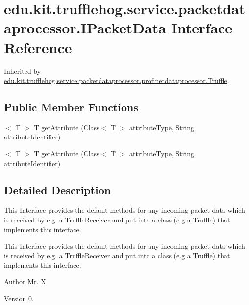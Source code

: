 \hypertarget{interfaceedu_1_1kit_1_1trufflehog_1_1service_1_1packetdataprocessor_1_1_i_packet_data}{}\section{edu.\+kit.\+trufflehog.\+service.\+packetdataprocessor.\+I\+Packet\+Data Interface Reference}
\label{interfaceedu_1_1kit_1_1trufflehog_1_1service_1_1packetdataprocessor_1_1_i_packet_data}


Inherited by \hyperlink{classedu_1_1kit_1_1trufflehog_1_1service_1_1packetdataprocessor_1_1profinetdataprocessor_1_1_truffle}{edu.\+kit.\+trufflehog.\+service.\+packetdataprocessor.\+profinetdataprocessor.\+Truffle}.

\subsection*{Public Member Functions}
\begin{DoxyCompactItemize}
\item 
$<$ T $>$ T \hyperlink{interfaceedu_1_1kit_1_1trufflehog_1_1service_1_1packetdataprocessor_1_1_i_packet_data_ac86d23f76548a696f5403a354d85ee5f}{get\+Attribute} (Class$<$ T $>$ attribute\+Type, String attribute\+Identifier)
\item 
$<$ T $>$ T \hyperlink{interfaceedu_1_1kit_1_1trufflehog_1_1service_1_1packetdataprocessor_1_1_i_packet_data_ac86d23f76548a696f5403a354d85ee5f}{get\+Attribute} (Class$<$ T $>$ attribute\+Type, String attribute\+Identifier)
\end{DoxyCompactItemize}


\subsection{Detailed Description}
This Interface provides the default methods for any incoming packet data which is received by e.\+g. a \hyperlink{}{Truffle\+Receiver} and put into a class (e.\+g a \hyperlink{}{Truffle}) that implements this interface. 

This Interface provides the default methods for any incoming packet data which is received by e.\+g. a \hyperlink{}{Truffle\+Receiver} and put into a class (e.\+g a \hyperlink{}{Truffle}) that implements this interface. 

\begin{DoxyAuthor}{Author}
Mr. X 
\end{DoxyAuthor}
\begin{DoxyVersion}{Version}
0. 
\end{DoxyVersion}


